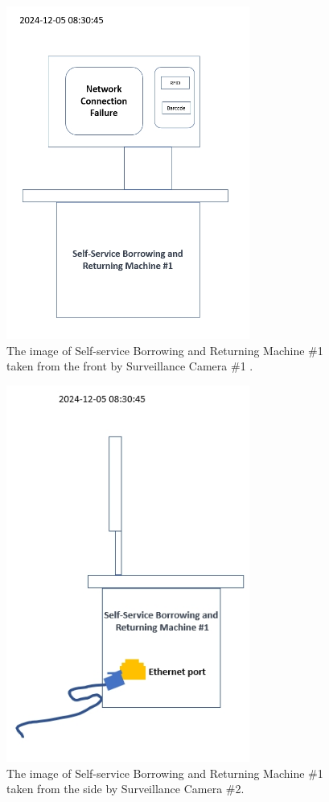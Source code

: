\documentclass[preprint,12pt]{elsarticle}
\begin{document}
\begin{figure}[!h]
	\centering
	\includegraphics[width=8cm]{zizhu_f.jpg}
	\caption{The image of Self-service Borrowing and Returning Machine \#1 taken from the front by Surveillance Camera \#1
		.}
	\label{img_machine_1}
\end{figure}




\begin{figure}[!h]
	\centering
	\includegraphics[width=8cm]{zizhu_s.jpg}
	\caption{The image of Self-service Borrowing and Returning Machine \#1 taken from the side by Surveillance Camera \#2.}
	\label{img_machine_2}
\end{figure}
\end{document}
